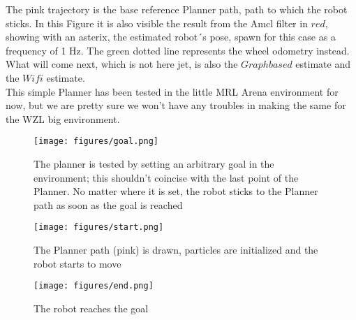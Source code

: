 \documentclass[11pt,a4paper]{article}
\begin{document}
The pink trajectory is the base reference Planner path, path to which the robot sticks. In this Figure it is also visible the result from the Amcl filter in $red$, showing with an asterix, the estimated robot´s pose, spawn for this case as a frequency of 1 Hz. The green dotted line represents the wheel odometry instead. What will come next, which is not here jet, is also the $Graphbased$ estimate and the $Wifi$ estimate. \\
This simple Planner has been tested in the little MRL Arena environment for now, but we are pretty sure we won't have any troubles in making the same for the WZL big environment. 
\begin{figure}[H]
  \texttt{[image: figures/goal.png]}
  \caption{The planner is tested by setting an arbitrary goal in the environment; this shouldn't coincise with the last point of the Planner. No matter where it is set, the robot sticks to the Planner path as soon as the goal is reached}\label{fig:goal}
\endminipage\hfill
{}
  \texttt{[image: figures/start.png]}
  \caption{The Planner path (pink) is drawn, particles are initialized and the robot starts to move}\label{fig:start}
\endminipage\hfill
{}%
  \texttt{[image: figures/end.png]}
  \caption{The robot reaches the goal}\label{fig:end}
\endminipage
\end{figure}
\end{document}
